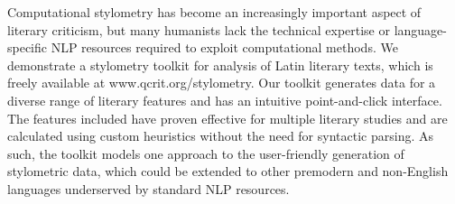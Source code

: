 Computational stylometry has become an increasingly important aspect of literary criticism, but many humanists lack the technical expertise or language-specific NLP resources required to exploit computational methods. We demonstrate a stylometry toolkit for analysis of Latin literary texts, which is freely available at www.qcrit.org/stylometry. Our toolkit generates data for a diverse range of literary features and has an intuitive point-and-click interface. The features included have proven effective for multiple literary studies and are calculated using custom heuristics without the need for syntactic parsing. As such, the toolkit models one approach to the user-friendly generation of stylometric data, which could be extended to other premodern and non-English languages  underserved by standard  NLP resources.